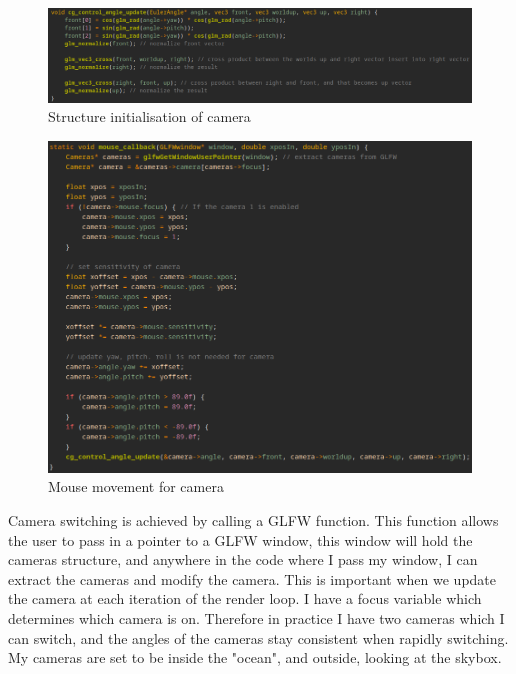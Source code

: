 \documentclass[a4paper, 10pt]{article}
\begin{document}
\newpage

\begin{figure}[h]
    \centering
    \includegraphics[scale=0.6]{images/camera-update}
    \caption{Structure initialisation of camera}
    \label{fig:camera-create-2}
\end{figure}

\begin{figure}[h]
    \centering
    \includegraphics[scale=0.8]{images/camera-mouse}
    \caption{Mouse movement for camera}
    \label{fig:camera-create-2}
\end{figure}

\newpage

Camera switching is achieved by calling a GLFW function. This function allows the user to pass in a pointer to a GLFW window, this window
will hold the cameras structure, and anywhere in the code where I pass my window, I can extract the cameras and modify the camera. This is important
when we update the camera at each iteration of the render loop. I have a focus variable which determines
which camera is on. Therefore in practice I have two cameras which I can switch, and the angles of the cameras stay consistent when rapidly switching.
My cameras are set to be inside the "ocean", and outside, looking at the skybox.
\end{document}

